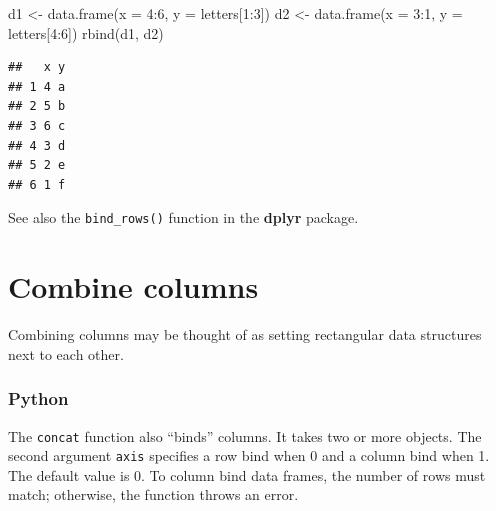 \documentclass[
]{book}
\newenvironment{Shaded}{\begin{snugshade}}{\end{snugshade}}
\newcommand{\AttributeTok}[1]{\textcolor[rgb]{0.77,0.63,0.00}{#1}}
\newcommand{\DecValTok}[1]{\textcolor[rgb]{0.00,0.00,0.81}{#1}}
\newcommand{\FunctionTok}[1]{\textcolor[rgb]{0.00,0.00,0.00}{#1}}
\newcommand{\NormalTok}[1]{#1}
\newcommand{\OtherTok}[1]{\textcolor[rgb]{0.56,0.35,0.01}{#1}}
\newcommand{\SpecialCharTok}[1]{\textcolor[rgb]{0.00,0.00,0.00}{#1}}
\begin{document}
\begin{Shaded}
\begin{Highlighting}[]
\NormalTok{d1 }\OtherTok{\textless{}{-}} \FunctionTok{data.frame}\NormalTok{(}\AttributeTok{x =} \DecValTok{4}\SpecialCharTok{:}\DecValTok{6}\NormalTok{, }\AttributeTok{y =}\NormalTok{ letters[}\DecValTok{1}\SpecialCharTok{:}\DecValTok{3}\NormalTok{])}
\NormalTok{d2 }\OtherTok{\textless{}{-}} \FunctionTok{data.frame}\NormalTok{(}\AttributeTok{x =} \DecValTok{3}\SpecialCharTok{:}\DecValTok{1}\NormalTok{, }\AttributeTok{y =}\NormalTok{ letters[}\DecValTok{4}\SpecialCharTok{:}\DecValTok{6}\NormalTok{])}
\FunctionTok{rbind}\NormalTok{(d1, d2)}
\end{Highlighting}
\end{Shaded}

\begin{verbatim}
##   x y
## 1 4 a
## 2 5 b
## 3 6 c
## 4 3 d
## 5 2 e
## 6 1 f
\end{verbatim}

See also the \texttt{bind\_rows()} function in the \textbf{dplyr} package.

\hypertarget{combine-columns}{%
\section{Combine columns}\label{combine-columns}}

Combining columns may be thought of as setting rectangular data structures next to each other.

\hypertarget{python-31}{%
\subsubsection*{Python}\label{python-31}}

The \texttt{concat} function also ``binds'' columns. It takes two or more objects. The second argument \texttt{axis} specifies a row bind when 0 and a column bind when 1. The default value is 0. To column bind data frames, the number of rows must match; otherwise, the function throws an error.
\end{document}
